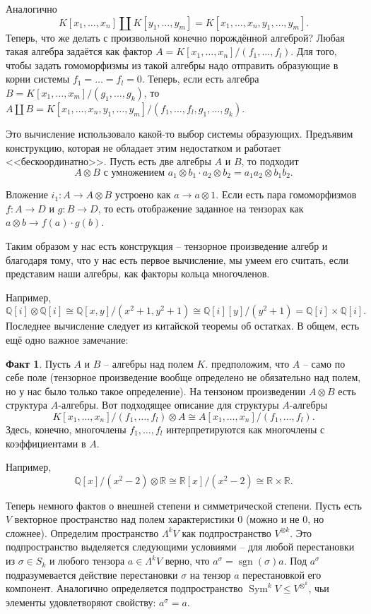 \documentclass[10pt,a4paper,oneside]{book}
\theoremstyle{definition}
\newtheorem*{fact}{Факт}
\newcommand{\mb}[1]{\mathbb{#1}}
\newcommand{\Sym}{\operatorname{Sym}}
\newcommand{\sgn}{\operatorname{sgn}}
\def\fct{\begin{fact}}
\def\efct{\end{fact}}
\begin{document}
Аналогично $$K[x_1,\dots, x_n] \coprod K[y_1,\dots,y_m]= K[x_1,\dots, x_n, y_1, \dots, y_m].$$
Теперь, что же делать с произвольной конечно порождённой алгеброй? Любая такая алгебра задаётся как фактор $A=K[x_1,\dots,x_n]/(f_1,\dots,f_l)$. Для того, чтобы задать гомоморфизмы из такой алгебры надо отправить образующие в корни системы $f_1=\dots=f_l=0$. Теперь, если есть алгебра $B=K[x_1,\dots,x_m]/(g_1,\dots,g_k)$, то $A\coprod B = K[x_1,\dots,x_n,y_1,\dots,y_m]/(f_1,\dots,f_l, g_1,\dots,g_k)$.


Это вычисление использовало какой-то выбор системы образующих. Предъявим конструкцию, которая не обладает этим недостатком и работает <<бескоординатно>>. Пусть есть две алгебры $A$ и $B$, то подходит $$A\otimes B \text{ с умножением } a_1\otimes b_1 \cdot a_2\otimes b_2 =a_1a_2\otimes b_1b_2.$$

Вложение  $i_1\colon A \to A\otimes B$ устроено как $a \to a\otimes 1$. Если есть пара гомоморфизмов $f\colon A\to D$ и $g\colon B \to D$, то есть отображение заданное на тензорах как $a\otimes b \to f(a)\cdot g(b)$. 


Таким образом у нас есть конструкция -- тензорное произведение алгебр и благодаря тому, что у нас есть первое вычисление, мы умеем его считать, если представим наши алгебры, как факторы кольца многочленов.

Например, $$\mb Q [i] \otimes  \mb Q[i] \cong \mb Q[x,y]/(x^2+1, y^2+1) \cong \mb Q[i][y]/(y^2+1)= \mb Q[i] \times \mb Q[i].$$
Последнее вычисление следует из китайской теоремы об остатках. В общем, есть ещё одно важное замечание:
\fct Пусть $A$ и $B$ -- алгебры над полем $K$. предположим, что $A$ -- само по себе поле (тензорное произведение вообще определено не обязательно над полем, но у нас было только такое определение). На тензоном произведении $A\otimes B$ есть структура $A$-алгебры. Вот подходящее описание для структуры $A$-алгебры  
$$ K[x_1,\dots,x_n]/(f_1,\dots,f_l) \otimes A\cong A[x_1,\dots,x_n]/(f_1,\dots,f_l).$$
Здесь, конечно, многочлены $f_1,\dots,f_l$ интерпретируются как многочлены с коэффициентами в $A$.
\efct

\noindent Например,
$$\mb Q[x]/(x^2-2) \otimes \mb R\cong \mb R[x]/(x^2-2) \cong \mb R\times \mb R.$$

Теперь немного фактов о внешней степени и симметрической степени. Пусть есть $V$ векторное пространство над полем характеристики $0$ (можно и не 0, но сложнее). Определим пространство $\Lambda^k V$ как подпространство $V^{\otimes k}$. Это подпространство выделяется следующими условиями -- для любой перестановки из $\sigma \in S_k$ и любого тензора $a\in \Lambda^k V$ верно, что $a^{\sigma}=\sgn(\sigma)a$. Под $a^{\sigma}$ подразумевается действие перестановки $\sigma$ на тензор $a$ перестановкой его компонент. Аналогично определяется подпространство $\Sym^k V \leq V^{\otimes^k}$, чьи элементы удовлетворяют свойству: $a^{\sigma}=a$.
\end{document}
